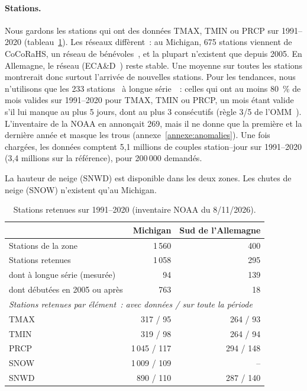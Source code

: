 \paragraph{Stations.}
Nous gardons les stations qui ont des données TMAX, TMIN ou PRCP sur 1991--2020 (tableau~\ref{tab:stations}). Les réseaux diffèrent~: au Michigan, 675 stations viennent de CoCoRaHS, un réseau de bénévoles~\cite{cifelli2005}, et la plupart n'existent que depuis 2005. En Allemagne, le réseau (ECA\&D~\cite{kleintank2002}) reste stable. Une moyenne sur toutes les stations montrerait donc surtout l'arrivée de nouvelles stations. Pour les tendances, nous n'utilisons que les 233 stations \guillemotleft~à longue série~\guillemotright{}~: celles qui ont au moins 80~\% de mois valides sur 1991--2020 pour TMAX, TMIN ou PRCP, un mois étant valide s'il lui manque au plus 5 jours, dont au plus 3 consécutifs (règle 3/5 de l'OMM~\cite{wmo2017}). L'inventaire de la NOAA en annonçait 269, mais il ne donne que la première et la dernière année et masque les trous (annexe~\ref{annexe:anomalies}). Une fois chargées, les données comptent 5,1 millions de couples station--jour sur 1991--2020 (3,4 millions sur la référence), pour 200\,000 demandés.

La hauteur de neige (SNWD) est disponible dans les deux zones. Les chutes de neige (SNOW) n'existent qu'au Michigan.

\begin{table}[h!]
  \centering
  \small
  \begin{tabular}{lrr}
    \hline
     & Michigan & Sud de l'Allemagne \\
    \hline
    Stations de la zone & 1\,560 & 400 \\
    Stations retenues & 1\,058 & 295 \\
    \quad dont à longue série (mesurée) & 94 & 139 \\
    \quad dont débutées en 2005 ou après & 763 & 18 \\
    \hline
    \multicolumn{3}{l}{\emph{Stations retenues par élément~: avec données / sur toute la période}} \\
    TMAX & 317 / 95 & 264 / 93 \\
    TMIN & 319 / 98 & 264 / 94 \\
    PRCP & 1\,045 / 117 & 294 / 148 \\
    SNOW & 1\,009 / 109 & -- \\
    SNWD & 890 / 110 & 287 / 140 \\
    \hline
  \end{tabular}
  \caption{Stations retenues sur 1991--2020 (inventaire NOAA du 8/11/2026).}
  \label{tab:stations}
\end{table}

